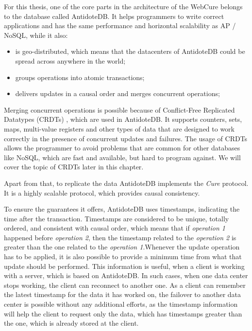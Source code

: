 For this thesis, one of the core parts in the architecture of the WebCure belongs to the database called AntidoteDB\cite{4}. It helps programmers to write correct applications and has the same performance and horizontal scalability as AP / NoSQL\cite{14}, while it also:

\begin{itemize}
\item {is geo-distributed, which means that the datacenters of AntidoteDB could be spread across anywhere in the world;}
\item {groups operations into atomic transactions\cite{9, 15};}
\item {delivers updates in a causal order and merges concurrent operations;}
\end{itemize} 

Merging concurrent operations is possible because of Conflict-Free Replicated Datatypes (CRDTs) \cite{2}, which are used in AntidoteDB. It supports counters, sets, maps, multi-value registers and other types of data that are designed to work correctly in the presence of concurrent updates and failures. The usage of CRDTs allows the programmer to avoid problems that are common for other databases like NoSQL, which are fast and available, but hard to program against\cite{15}. We will cover the topic of CRDTs later in this chapter.

Apart from that, to replicate the data AntidoteDB implements the \textit{Cure}\cite{15} protocol. It is a highly scalable protocol, which provides causal consistency. 

To ensure the guarantees it offers, AntidoteDB uses timestamps, indicating the time after the transaction. Timestamps are considered to be unique, totally ordered, and consistent with causal order, which means that if \textit{operation 1} happened before \textit{operation 2}, then the timestamp related to the \textit{operation 2} is greater than the one related to the \textit{operation 1}\cite{2}.Whenever the update operation has to be applied, it is also possible to provide a minimum time from what that update should be performed. This information is useful, when a client is working with a server, which is based on AntidoteDB. In such cases, when one data center stops working, the client can reconnect to another one. As a client can remember the latest timestamp for the data it has worked on, the failover to another data center is possible without any additional efforts, as the timestamp information will help the client to request only the data, which has timestamps greater than the one, which is already stored at the client.


